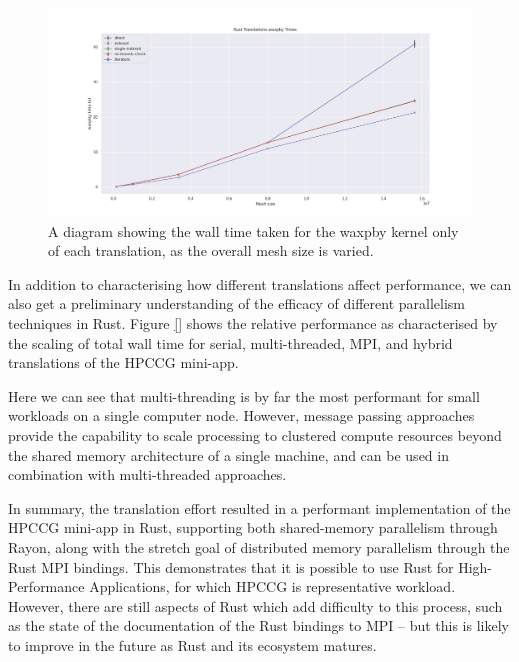 \begin{figure}[H]
    \centering
    \includegraphics[width=\textwidth]{images/3_translation/translations_waxpby_line.png}
    \caption{A diagram showing the wall time taken for the waxpby kernel only of each translation, as the overall mesh size is varied.}
    \label{fig:translations_waxpby_line}
\end{figure}

In addition to characterising how different translations affect performance, we can also get a preliminary understanding of the efficacy of different parallelism techniques in Rust. Figure \ref{} shows the relative performance as characterised by the scaling of total wall time for serial, multi-threaded, MPI, and hybrid translations of the HPCCG mini-app.


Here we can see that multi-threading is by far the most performant for small workloads on a single computer node. However, message passing approaches provide the capability to scale processing to clustered compute resources beyond the shared memory architecture of a single machine, and can be used in combination with multi-threaded approaches.

In summary, the translation effort resulted in a performant implementation of the HPCCG mini-app in Rust, supporting both shared-memory parallelism through Rayon, along with the stretch goal of distributed memory parallelism through the Rust MPI bindings. This demonstrates that it is possible to use Rust for High-Performance Applications, for which HPCCG is representative workload. However, there are still aspects of Rust which add difficulty to this process, such as the state of the documentation of the Rust bindings to MPI -- but this is likely to improve in the future as Rust and its ecosystem matures.



